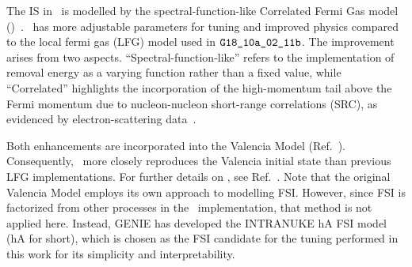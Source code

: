     The IS in \gZero\ is modelled by the spectral-function-like Correlated Fermi Gas model (\sfcfg)~\cite{sfcfg-talk,sfcfg-GitHubCommit,GENIE:2021npt}. 
    \sfcfg\ has more adjustable parameters for tuning and improved physics compared to the local fermi gas (LFG) model used in $\texttt{G18\_10a\_02\_11b}$.
    The improvement arises from two aspects. 
    ``Spectral-function-like'' refers to the implementation of removal energy as a varying function rather than a fixed value, while ``Correlated'' highlights the incorporation of the high-momentum tail above the Fermi momentum due to nucleon-nucleon short-range correlations (SRC), as evidenced by electron-scattering data~\cite{CLAS:2005ola}.

    Both enhancements are incorporated into the Valencia Model (Ref.~\cite{Nieves:2004wx}).  
    Consequently, \sfcfg\ more closely reproduces the Valencia initial state than previous LFG implementations.  
    For further details on \sfcfg, see Ref.~\cite{GENIE:2021npt}.  
    Note that the original Valencia Model employs its own approach to modelling FSI. 
    However, since FSI is factorized from other processes in the \genie\ implementation, that method is not applied here.  
    Instead, GENIE has developed the INTRANUKE hA FSI model (hA for short), which is chosen as the FSI candidate for the tuning performed in this work for its simplicity and interpretability.

